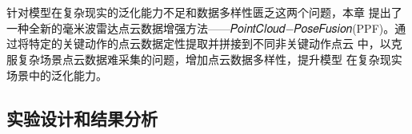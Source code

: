 \chapter{}
针对模型在复杂现实的泛化能力不足和数据多样性匮乏这两个问题，本章
提出了一种全新的毫米波雷达点云数据增强方法——𝑃𝑜𝑖𝑛𝑡𝐶𝑙𝑜𝑢𝑑−𝑃𝑜𝑠𝑒𝐹𝑢𝑠𝑖𝑜𝑛(PPF)。通过将特定的关键动作的点云数据定性提取并拼接到不同非关键动作点云
中，以克服复杂场景点云数据难采集的问题，增加点云数据多样性，提升模型
在复杂现实场景中的泛化能力。

\section{实验设计和结果分析}
\subsection{}

